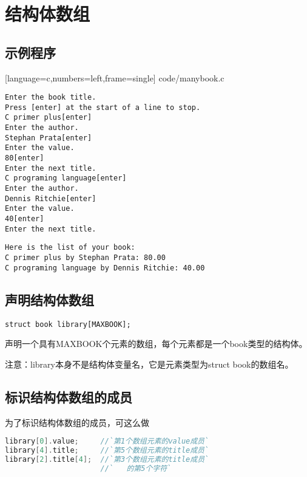 \section{结构体数组}

\subsection{示例程序}

\begin{frame}\ft{\subsecname}

[language=c,numbers=left,frame=single]
{code/manybook.c}
\end{frame}

\begin{frame}[fragile]\ft{\subsecname}
  \begin{lstlisting}[backgroundcolor=\color{blue!20}]
Enter the book title.
Press [enter] at the start of a line to stop.
C primer plus[enter]
Enter the author.
Stephan Prata[enter]
Enter the value.
80[enter]
Enter the next title.
C programing language[enter]
Enter the author.
Dennis Ritchie[enter]
Enter the value.
40[enter]
Enter the next title.

  \end{lstlisting}
\end{frame}

\begin{frame}[fragile]\ft{\subsecname}
  \begin{lstlisting}[backgroundcolor=\color{blue!20}]
Here is the list of your book:
C primer plus by Stephan Prata: 80.00
C programing language by Dennis Ritchie: 40.00    
  \end{lstlisting}
\end{frame}

\subsection{声明结构体数组}
\begin{frame}[fragile]\ft{\subsecname}
  \begin{lstlisting}
struct book library[MAXBOOK];
  \end{lstlisting}
声明一个具有{\tf MAXBOOK}个元素的数组，每个元素都是一个{\tf book}类型的结构体。\vspace{0.1in}

注意：{\tf library}本身不是结构体变量名，它是元素类型为{\tf struct book}的数组名。
\end{frame}

\subsection{标识结构体数组的成员}
\begin{frame}[fragile]\ft{\subsecname}
  为了标识结构体数组的成员，可这么做
  \begin{lstlisting}[language=c,backgroundcolor=\color{red!20}]
library[0].value;     //`第1个数组元素的value成员`
library[4].title;     //`第5个数组元素的title成员`
library[2].title[4];  //`第3个数组元素的title成员`
                      //`   的第5个字符`
  \end{lstlisting}
\end{frame}

